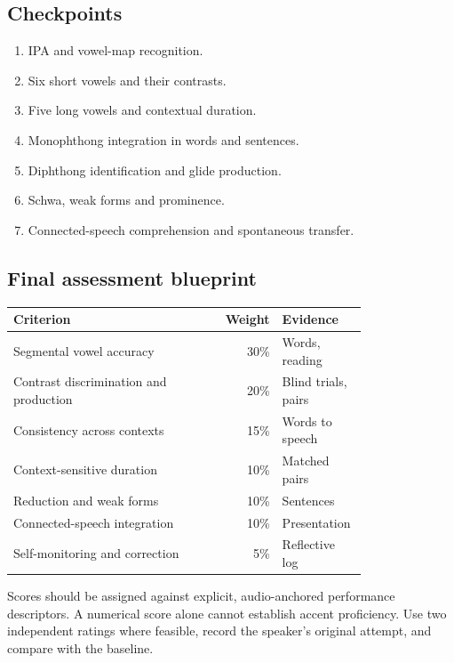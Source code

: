 \subsection{Checkpoints}
\begin{enumerate}
\item IPA and vowel-map recognition.
\item Six short vowels and their contrasts.
\item Five long vowels and contextual duration.
\item Monophthong integration in words and sentences.
\item Diphthong identification and glide production.
\item Schwa, weak forms and prominence.
\item Connected-speech comprehension and spontaneous transfer.
\end{enumerate}
\subsection{Final assessment blueprint}
\begin{longtable}{p{0.55\linewidth}r p{0.24\linewidth}}
\toprule Criterion & Weight & Evidence\\\midrule\endhead
Segmental vowel accuracy & 30\% & Words, reading\\
Contrast discrimination and production & 20\% & Blind trials, pairs\\
Consistency across contexts & 15\% & Words to speech\\
Context-sensitive duration & 10\% & Matched pairs\\
Reduction and weak forms & 10\% & Sentences\\
Connected-speech integration & 10\% & Presentation\\
Self-monitoring and correction & 5\% & Reflective log\\
\bottomrule\end{longtable}
\noindent Scores should be assigned against explicit, audio-anchored performance descriptors. A numerical score alone cannot establish accent proficiency. Use two independent ratings where feasible, record the speaker's original attempt, and compare with the baseline.
